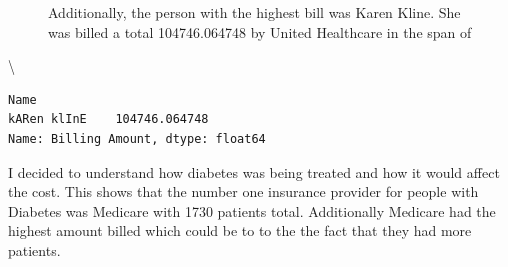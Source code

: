 \documentclass[
  letterpaper,
  DIV=11,
  numbers=noendperiod]{scrartcl}
\begin{document}
\begin{figure}[H]


\caption{\label{fig-margin-cap}Additionally, the person with the highest
bill was Karen Kline. She was billed a total 104746.064748 by United
Healthcare in the span of}

\end{figure}%

\textbackslash{}

\begin{verbatim}
Name
kARen klInE    104746.064748
Name: Billing Amount, dtype: float64
\end{verbatim}

I decided to understand how diabetes was being treated and how it would
affect the cost. This shows that the number one insurance provider for
people with Diabetes was Medicare with 1730 patients total. Additionally
Medicare had the highest amount billed which could be to to the the fact
that they had more patients.
\end{document}
